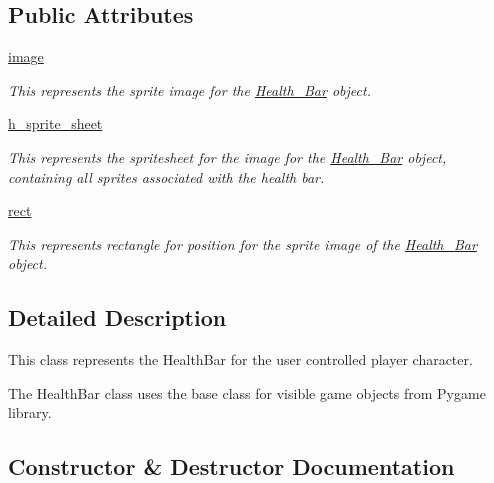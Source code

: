 \subsection*{Public Attributes}
\begin{DoxyCompactItemize}
\item 
\hyperlink{classactor_1_1healthbar_1_1_health___bar_a46e7454053636308c9a17dd63e73a8ee}{image}
\begin{DoxyCompactList}\small\item\em This represents the sprite image for the \hyperlink{classactor_1_1healthbar_1_1_health___bar}{Health\+\_\+\+Bar} object. \end{DoxyCompactList}\item 
\hyperlink{classactor_1_1healthbar_1_1_health___bar_a75ae2266b6d6757be66530b63f413fbd}{h\+\_\+sprite\+\_\+sheet}
\begin{DoxyCompactList}\small\item\em This represents the spritesheet for the image for the \hyperlink{classactor_1_1healthbar_1_1_health___bar}{Health\+\_\+\+Bar} object, containing all sprites associated with the health bar. \end{DoxyCompactList}\item 
\hyperlink{classactor_1_1healthbar_1_1_health___bar_add2392af674af1341a9bef3d18640e83}{rect}
\begin{DoxyCompactList}\small\item\em This represents rectangle for position for the sprite image of the \hyperlink{classactor_1_1healthbar_1_1_health___bar}{Health\+\_\+\+Bar} object. \end{DoxyCompactList}\end{DoxyCompactItemize}


\subsection{Detailed Description}
This class represents the Health\+Bar for the user controlled player character. 

The Health\+Bar class uses the base class for visible game objects from Pygame library. 

\subsection{Constructor \& Destructor Documentation}
\mbox{\label{classactor_1_1healthbar_1_1_health___bar_a1f35a409c7e1fc7d36600891b7a4a796}} 
